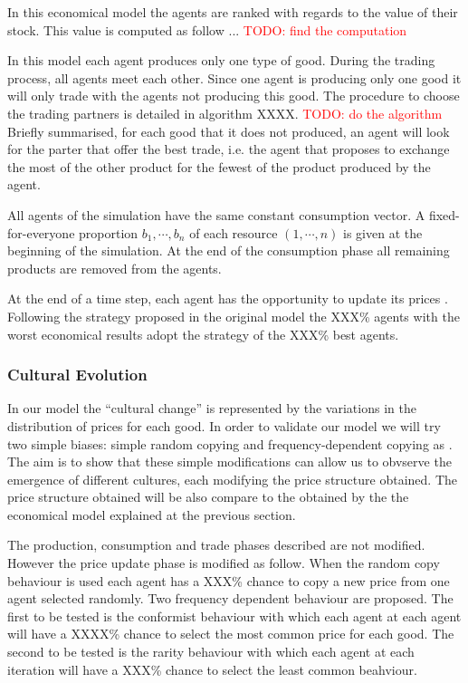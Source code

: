 \documentclass{wscpaperproc}
\newcommand{\memo}[2]{\textcolor{#1}{#2}}
\newcommand{\todo}[1]{\memo{red}{TODO: #1\\}}
\begin{document}
In this economical model the agents are ranked with regards to the value of their stock. This value is computed as follow ...
\todo{find the computation}

In this model each agent produces only one type of good. During the trading process, all agents meet each other. Since one agent is producing only one good it will only trade with the agents not producing this good. The procedure to choose the trading partners is detailed in algorithm XXXX.
\todo{do the algorithm}
Briefly summarised, for each good that it does not produced, an agent will look for the parter that offer the best trade, i.e. the agent that proposes to exchange the most of the other product for the fewest of the product produced by the agent.

All agents of the simulation have the same constant consumption vector. A fixed-for-everyone proportion $b_1,\cdots,b_n$ of each resource $(1, \cdots, n)$ is given at the beginning of the simulation. At the end of the consumption phase all remaining products are removed from the agents.

At the end of a time step, each agent has the opportunity to update its prices . Following the strategy proposed in the original model the XXX\% agents with the worst economical results adopt the strategy of the XXX\% best agents.


\subsubsection{Cultural Evolution}

In our model the ``cultural change'' is represented by the variations in the distribution of prices for each good. In order to validate our model we will try two simple biases: simple random copying and frequency-dependent copying as \cite{mesoudi_random_2009}. The aim is to show that these simple modifications can allow us to obvserve the emergence of different cultures, each modifying the price structure obtained. The price structure obtained will be also compare to the obtained by the the economical model explained at the previous section.

The production, consumption and trade phases described are not modified. However the price update phase is modified as follow. When the random copy behaviour is used each agent has a XXX\% chance to copy a new price from one agent selected randomly. Two frequency dependent behaviour are proposed. The first to be tested is the conformist behaviour with which each agent at each agent will have a XXXX\% chance to select the most common price for each good. The second to be tested is the rarity behaviour with which each agent at each iteration will have a XXX\% chance to select the least common beahviour.
\end{document}
